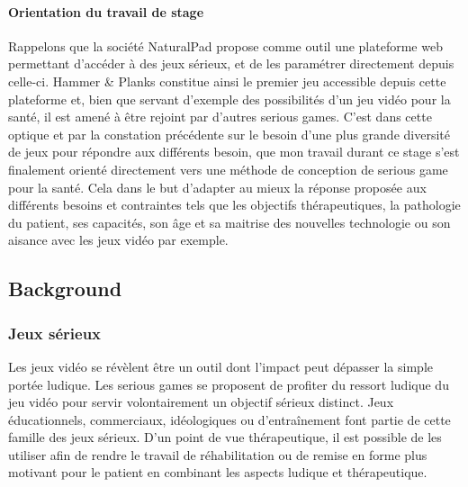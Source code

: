 	\paragraph{Orientation du travail de stage \\}
Rappelons que la société NaturalPad propose comme outil une plateforme web permettant d'accéder à des jeux sérieux, et de les paramétrer directement depuis celle-ci. Hammer \& Planks constitue ainsi le premier jeu accessible depuis cette plateforme et, bien que servant d'exemple des possibilités d'un jeu vidéo pour la santé, il est amené à être rejoint par d'autres serious games. C'est dans cette optique et par la constation précédente sur le besoin d'une plus grande diversité de jeux pour répondre aux différents besoin, que mon travail durant ce stage s'est finalement orienté directement vers une méthode de conception de serious game pour la santé. Cela dans le but d'adapter au mieux la réponse proposée aux différents besoins et contraintes tels que les objectifs thérapeutiques, la pathologie du patient, ses capacités, son âge et sa maitrise des nouvelles technologie ou son aisance avec les jeux vidéo par exemple.

\subsection{Background}
	\subsubsection{Jeux sérieux}
Les jeux vidéo se révèlent être un outil dont l’impact peut dépasser la simple portée ludique. Les serious games se proposent de profiter du ressort ludique du jeu vidéo pour servir volontairement un objectif sérieux distinct. Jeux éducationnels, commerciaux, idéologiques ou d’entraînement font partie de cette famille des jeux sérieux. D’un point de vue thérapeutique, il est possible de les utiliser afin de rendre le travail de réhabilitation ou de remise en forme plus motivant pour le patient en combinant les aspects ludique et thérapeutique.

